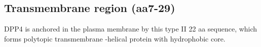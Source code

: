 \subsection{Transmembrane region (aa7-29)}

DPP4 is anchored in the plasma membrane by this type II 22 aa sequence, which forms polytopic transmembrane \alpha-helical protein with hydrophobic core.~\cite{Hong_1990}